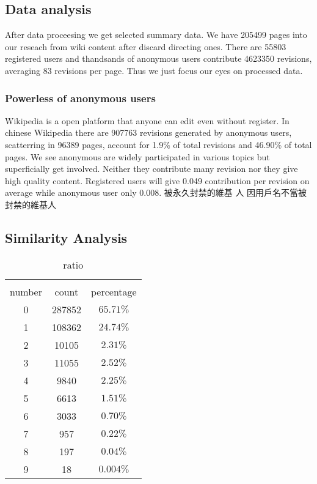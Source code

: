 \documentclass{elsarticle}
\begin{document}
\subsection{Data analysis}
\label{sec:data-analysis}

After data proceesing we get selected summary data. We have 205499
pages into our reseach from wiki content after discard directing
ones. There are 55803 registered users and thandsands of anonymous
users contribute 4623350 revisions, averaging  83 revisions per
page. Thus we just focus our eyes on processed data.

\subsubsection{Powerless of anonymous users}
\label{sec:powerl-anonym-users}
Wikipedia is  a open platform that anyone can edit even without
register. In chinese Wikipedia there are 907763  revisions generated
by anonymous users, scatterring in 96389 pages, account for 1.9\% of
total revisions and 46.90\% of total pages. We see anonymous are
widely participated in various topics but  superficially get
involved. Neither they contribute many revision nor they give high
quality content. Registered users will give 0.049 contribution per
revision on average while anonymous user only 0.008. 被永久封禁的維基
人 因用戶名不當被封禁的維基人

\subsection{Similarity Analysis}
\label{sec:similarity-analysis}

\begin{table}
    \centering
    \caption{ratio}
    \begin{tabular}[center]{|c|c|c}
      \hline\\
      number & count & percentage \\\hline
      0 & 287852& $65.71\%$\\\hline
 1 & 108362& $24.74\%$\\\hline
      2 & 10105& $2.31\%$\\\hline
      3 & 11055& $2.52\%$\\\hline
      4 & 9840&$2.25\%$ \\\hline
      5 & 6613& $1.51\%$\\\hline
      6 & 3033& $0.70\%$\\\hline
      7 & 957& $0.22\%$\\\hline
      8 & 197& $0.04\%$\\\hline
      9 & 18& $0.004\%$\\\hline
     
    \end{tabular}
   
 \end{table}
  
\end{document}
